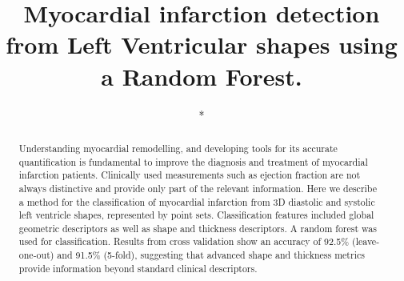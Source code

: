 \documentclass{llncs}
\begin{document}
%
\title{Myocardial infarction detection from Left Ventricular shapes using a Random Forest.}
%
%
\author{*}
%

%
\institute{*\\
\email{*}\\
}

\maketitle              %

\begin{abstract}
Understanding myocardial remodelling, and developing tools for its accurate quantification is fundamental to improve the diagnosis and treatment of myocardial infarction patients. Clinically used measurements such as ejection fraction are not always distinctive and provide only part of the relevant information.  Here we describe a method for the classification of myocardial infarction from 3D diastolic and systolic left ventricle shapes, represented by point sets. Classification features included global geometric descriptors as well as shape and thickness descriptors. A random forest was used for classification. Results from cross validation show an accuracy of 92.5\% (leave-one-out) and 91.5\% (5-fold), suggesting that advanced shape and thickness metrics provide information beyond standard clinical descriptors.
\end{abstract}
%
\end{document}
